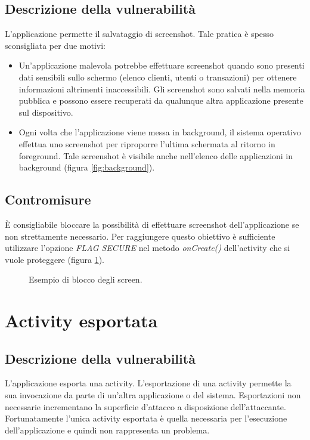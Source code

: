 \subsection{Descrizione della vulnerabilità}
L'applicazione permette il salvataggio di screenshot. Tale pratica è spesso sconsigliata per due motivi:
\begin{itemize}
	\item Un'applicazione malevola potrebbe effettuare screenshot quando sono presenti dati sensibili sullo schermo (elenco clienti, utenti o transazioni) per ottenere informazioni altrimenti inaccessibili. Gli screenshot sono salvati nella memoria pubblica e possono essere recuperati da qualunque altra applicazione presente sul dispositivo.
	\item Ogni volta che l'applicazione viene messa in background, il sistema operativo effettua uno screenshot per riproporre l'ultima schermata al ritorno in foreground. Tale screenshot è visibile anche nell'elenco delle applicazioni in background (figura \ref{fig:background}).
\end{itemize}

\subsection{Contromisure}
È consigliabile bloccare la possibilità di effettuare screenshot dell'applicazione se non strettamente necessario. Per raggiungere questo obiettivo è sufficiente utilizzare l'opzione \emph{FLAG SECURE} nel metodo \emph{onCreate()} dell'activity che si vuole proteggere (figura \ref{fig:screen}).

\begin{figure}[h]
	\centering 
	\caption{Esempio di blocco degli screen.}
	\label{fig:screen}
\end{figure}

\section{Activity esportata}

\subsection{Descrizione della vulnerabilità}
L'applicazione esporta una activity. L'esportazione di una activity permette la sua invocazione da parte di un'altra applicazione o del sistema. Esportazioni non necessarie incrementano la superficie d'attacco a disposizione dell'attaccante. Fortunatamente l'unica activity esportata è quella necessaria per l'esecuzione dell'applicazione e quindi non rappresenta un problema. 

